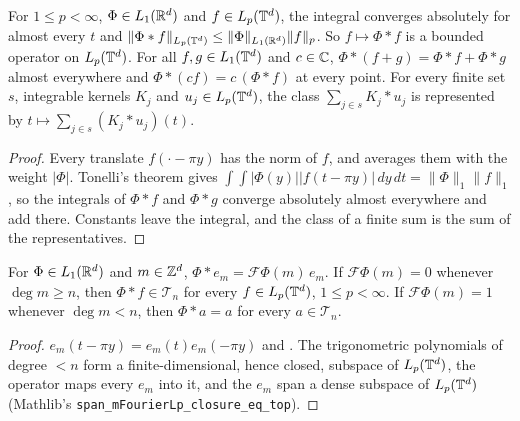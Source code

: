 \begin{lemma}
\label{lem:torus-econv-young}
\leanok
{}
For $1 \leq p < \infty$, $\Phi \in L_1(\mathbb{R}^d)$ and $f \in L_p(\mathbb{T}^d)$, the integral converges
absolutely for almost every $t$ and $\|\Phi * f\|_{L_p(\mathbb{T}^d)} \leq \|\Phi\|_{L_1(\mathbb{R}^d)} \|f\|_p$.
So $f \mapsto \Phi * f$ is a bounded operator on $L_p(\mathbb{T}^d)$. For all $f, g \in L_1(\mathbb{T}^d)$ and
$c \in \mathbb{C}$, $\Phi * (f + g) = \Phi * f + \Phi * g$ almost everywhere and
$\Phi * (c f) = c \, (\Phi * f)$ at every point. For every finite set $s$, integrable kernels
$K_j$ and $u_j \in L_p(\mathbb{T}^d)$, the class $\sum_{j \in s} K_j * u_j$ is represented by
$t \mapsto \sum_{j \in s} (K_j * u_j)(t)$.
\end{lemma}

\begin{proof}
\leanok
Every translate $f(\cdot - \pi y)$ has the norm of $f$, and  averages
them with the weight $|\Phi|$. Tonelli's theorem gives
$\int \int |\Phi(y)| |f(t - \pi y)| \, dy \, dt = \|\Phi\|_1 \|f\|_1$, so the integrals of
$\Phi * f$ and $\Phi * g$ converge absolutely almost everywhere and add there. Constants leave the
integral, and the class of a finite sum is the sum of the representatives.
\end{proof}

\begin{theorem}
\label{thm:torus-econv-fourier}
\leanok
{}
For $\Phi \in L_1(\mathbb{R}^d)$ and $m \in \mathbb{Z}^d$, $\Phi * e_m = \mathcal{F}\Phi(m) \, e_m$. If
$\mathcal{F}\Phi(m) = 0$ whenever $\deg m \geq n$, then $\Phi * f \in \mathcal{T}_n$ for every
$f \in L_p(\mathbb{T}^d)$, $1 \leq p < \infty$. If $\mathcal{F}\Phi(m) = 1$ whenever $\deg m < n$, then
$\Phi * a = a$ for every $a \in \mathcal{T}_n$.
\end{theorem}

\begin{proof}
\leanok
$e_m(t - \pi y) = e_m(t) e_m(-\pi y)$ and . The trigonometric polynomials of
degree $< n$ form a finite-dimensional, hence closed, subspace of $L_p(\mathbb{T}^d)$, the operator maps
every $e_m$ into it, and the $e_m$ span a dense subspace of $L_p(\mathbb{T}^d)$ (Mathlib's
\texttt{span\_\allowbreak mFourierLp\_\allowbreak closure\_\allowbreak eq\_\allowbreak top}).
\end{proof}

